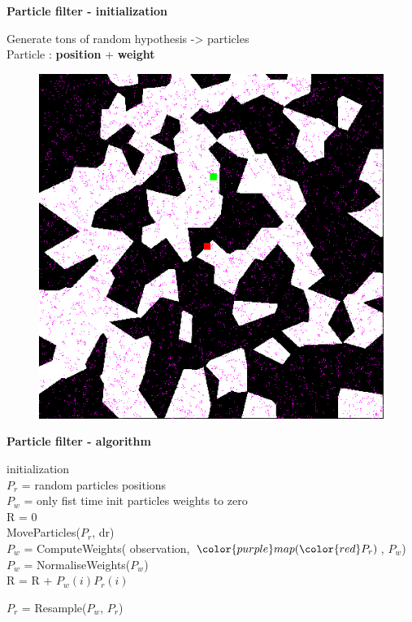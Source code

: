 \documentclass[xcolor=dvipsnames]{beamer}
\begin{document}
\begin{frame}{\bf Particle filter - initialization}

Generate tons of random hypothesis -> particles \\
Particle : {\bf position} + {\bf weight} \\

\begin{figure}[htbp]
  \centering
   \includegraphics[scale=0.27]{../pictures/particles.png}
\end{figure}


\end{frame}



\begin{frame}{\bf Particle filter - algorithm}


\begin{algorithm}[H]
 initialization  \\
                 {\color{red}$P_r$} = random particles positions \\
                 {\color{blue}$P_w$} = only fist time init particles weights to zero \\
                  R = 0 \\
 MoveParticles({\color{red}$P_r$}, {\color{red}dr}) \\
 {\color{blue}$P_w$} = ComputeWeights({\color{green} observation}, ${\color{purple}map}({\color{red}P_r})$,  {\color{blue}$P_w$}) \\
 {\color{blue}$P_w$} = NormaliseWeights({\color{blue}$P_w$}) \\
 {
  R = R + {\color{blue}$P_w(i)$}{\color{red}$P_r(i)$}
 }

 {\color{red}$P_r$} = Resample({\color{blue}$P_w$}, {\color{red}$P_r$})


\end{algorithm}


\end{frame}
\end{document}
